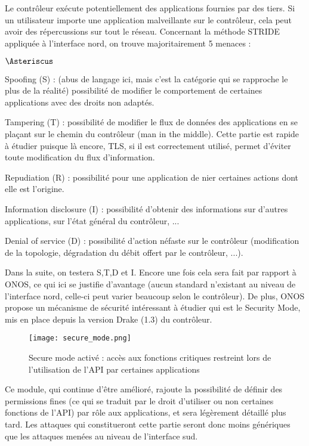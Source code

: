 Le contrôleur exécute potentiellement des applications fournies par des tiers. Si un utilisateur  importe une application malveillante sur le contrôleur, cela peut avoir des répercussions sur tout le réseau.
Concernant la méthode STRIDE appliquée à l'interface nord, on trouve majoritairement 5 menaces :

\begin{list}{$\Asteriscus$}{}

\item Spoofing (S) : (abus de langage ici, mais c'est la catégorie qui se rapproche le plus de la réalité) possibilité de modifier le comportement de certaines applications avec des droits non adaptés.

\item Tampering (T) : possibilité de modifier le flux de données des applications en se plaçant sur le chemin du contrôleur (man in the middle). Cette partie est rapide à étudier puisque là encore, TLS, si il est correctement utilisé, permet d’éviter toute modification du flux d'information.

\item Repudiation (R) : possibilité pour une application de nier certaines actions dont elle est l'origine.

\item Information disclosure (I) : possibilité d’obtenir des informations sur d'autres applications, sur l'état général du contrôleur, ...

\item Denial of service (D) : possibilité d'action néfaste sur le contrôleur (modification de la topologie, dégradation du débit offert par le contrôleur, ...).

\end{list}

Dans la suite, on testera S,T,D et I. Encore une fois cela sera fait par rapport à ONOS, ce qui ici se justifie d'avantage (aucun standard n'existant au niveau de l'interface nord, celle-ci peut varier beaucoup selon le contrôleur). De plus, ONOS propose un mécanisme de sécurité intéressant à étudier qui est le Security Mode, mis en place depuis la version Drake (1.3) du contrôleur.

\begin{figure}[h]
  	\centering
  	\texttt{[image: secure\_mode.png]}
  	\caption{Secure mode activé : accès aux fonctions critiques restreint lors de l'utilisation de l'API par certaines applications}
\end{figure}

Ce module, qui continue d'être amélioré, rajoute la possibilité de définir des permissions fines (ce qui se traduit par le droit d'utiliser ou non certaines fonctions de l'API) par rôle aux applications, et sera légèrement détaillé plus tard. Les attaques qui constitueront cette partie seront donc moins génériques que les attaques menées au niveau de l'interface sud.
